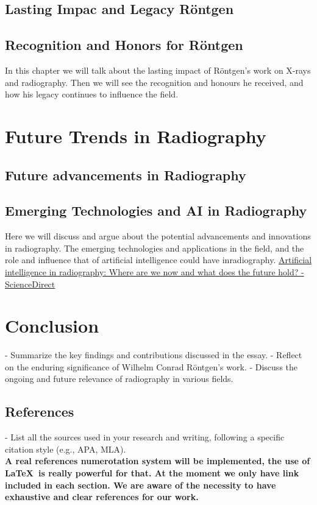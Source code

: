 \documentclass[a4paper,12pt]{report}
\begin{document}
\section{Lasting Impac and Legacy Röntgen}
\section{Recognition and Honors for Röntgen}
In this chapter we will talk about the lasting impact of Röntgen's work on X-rays and radiography. Then we will see the recognition and honours he received, and how his legacy continues to influence the field.

\chapter{Future Trends in Radiography}
\section{Future advancements in Radiography}
\section{Emerging Technologies and AI in Radiography}
Here we will discuss and argue about the potential advancements and innovations in radiography. The emerging technologies and applications in the field, and the role and influence that of artificial intelligence could have inradiography.
\href{https://www.sciencedirect.com/science/article/abs/pii/S107881742100095X}{Artificial intelligence in radiography: Where are we now and what does the future hold? - ScienceDirect }
\chapter{Conclusion}

- Summarize the key findings and contributions discussed in the essay.
- Reflect on the enduring significance of Wilhelm Conrad Röntgen's work.
- Discuss the ongoing and future relevance of radiography in various fields.

\newpage
\section*{\Huge{References}}
- List all the sources used in your research and writing, following a specific citation style (e.g., APA, MLA).\\[1ex]
\textbf{A real references numerotation system will be implemented, the use of  \LaTeX\ is really powerful for that. At the moment we only have link included in each section. We are aware of the necessity to have exhaustive and clear references for our work. }\\[1ex]
\end{document}
